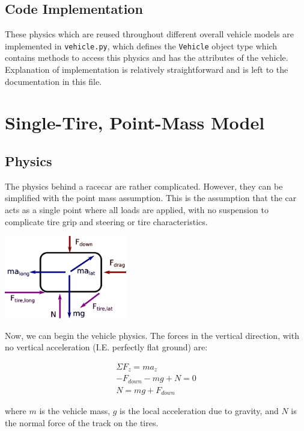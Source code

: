 \documentclass{article}
\begin{document}
\subsection{Code Implementation}
These physics which are reused throughout different overall vehicle models are implemented in \texttt{vehicle.py}, which defines the \texttt{Vehicle} object type which contains methods to access this physics and has the attributes of the vehicle. Explanation of implementation is relatively straightforward and is left to the documentation in this file.

\section{Single-Tire, Point-Mass Model}

\subsection{Physics}

The physics behind a racecar are rather complicated. However, they can be simplified with the point mass assumption. This is the assumption that the car acts as a single point where all loads are applied, with no suspension to complicate tire grip and steering or tire characteristics.

\begin{center}
\includegraphics[width=0.4\textwidth]{single_fbd.png}
\end{center}

Now, we can begin the vehicle physics. The forces in the vertical direction, with no vertical acceleration (I.E. perfectly flat ground) are:

\begin{align}
	\Sigma F_z = m a_z \\
    -F_{down} -m g + N  = 0 \\
    N = m g + F_{down} \label{eq_z}
\end{align}

where $m$ is the vehicle mass, $g$ is the local acceleration due to gravity, and $N$ is the normal force of the track on the tires.
\end{document}
